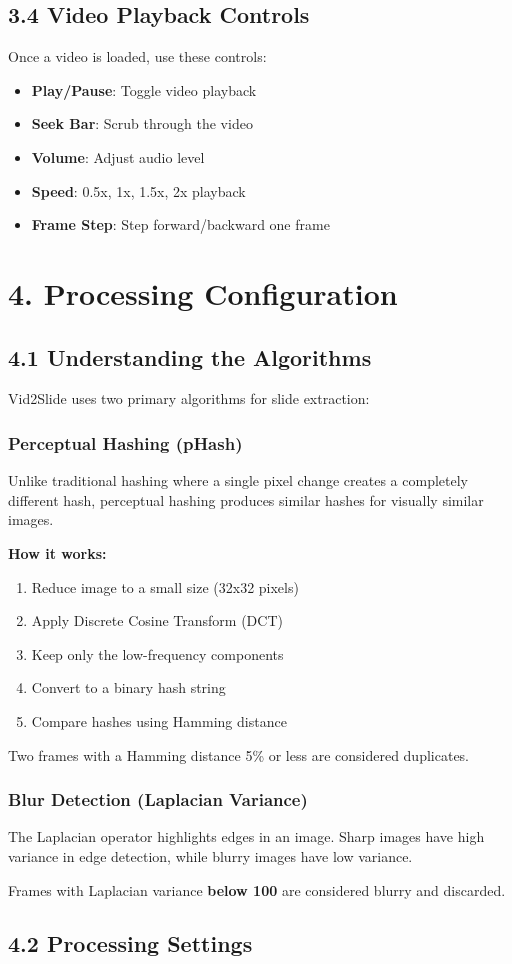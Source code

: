 \documentclass[12pt,a4paper]{article}
\newcommand{\sectionTitle}[1]{\section*{#1}}
\newcommand{\subsectionTitle}[1]{\subsection*{#1}}
\newcommand{\subsubsectionTitle}[1]{\subsubsection*{#1}}
\begin{document}
\subsectionTitle{3.4 Video Playback Controls}

Once a video is loaded, use these controls:
\begin{itemize}
    \item \textbf{Play/Pause}: Toggle video playback
    \item \textbf{Seek Bar}: Scrub through the video
    \item \textbf{Volume}: Adjust audio level
    \item \textbf{Speed}: 0.5x, 1x, 1.5x, 2x playback
    \item \textbf{Frame Step}: Step forward/backward one frame
\end{itemize}

\newpage

\sectionTitle{4. Processing Configuration}

\subsectionTitle{4.1 Understanding the Algorithms}

Vid2Slide uses two primary algorithms for slide extraction:

\subsubsectionTitle{Perceptual Hashing (pHash)}

Unlike traditional hashing where a single pixel change creates a completely different hash, perceptual hashing produces similar hashes for visually similar images.

\textbf{How it works:}
\begin{enumerate}
    \item Reduce image to a small size (32x32 pixels)
    \item Apply Discrete Cosine Transform (DCT)
    \item Keep only the low-frequency components
    \item Convert to a binary hash string
    \item Compare hashes using Hamming distance
\end{enumerate}

Two frames with a Hamming distance 5\% or less are considered duplicates.

\subsubsectionTitle{Blur Detection (Laplacian Variance)}

The Laplacian operator highlights edges in an image. Sharp images have high variance in edge detection, while blurry images have low variance.

Frames with Laplacian variance \textbf{below 100} are considered blurry and discarded.

\subsectionTitle{4.2 Processing Settings}
\end{document}
